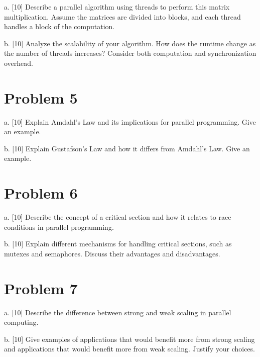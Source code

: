 \documentclass{article}
\begin{document}
a. [10] Describe a parallel algorithm using threads to perform this matrix multiplication.  Assume the matrices are divided into blocks, and each thread handles a block of the computation.

b. [10] Analyze the scalability of your algorithm.  How does the runtime change as the number of threads increases? Consider both computation and synchronization overhead.


\section*{Problem 5}
a. [10] Explain Amdahl's Law and its implications for parallel programming. Give an example.

b. [10] Explain Gustafson's Law and how it differs from Amdahl's Law. Give an example.


\section*{Problem 6}
a. [10] Describe the concept of a critical section and how it relates to race conditions in parallel programming.

b. [10] Explain different mechanisms for handling critical sections, such as mutexes and semaphores.  Discuss their advantages and disadvantages.


\section*{Problem 7}
a. [10] Describe the difference between strong and weak scaling in parallel computing.

b. [10]  Give examples of applications that would benefit more from strong scaling and applications that would benefit more from weak scaling. Justify your choices.
\end{document}
